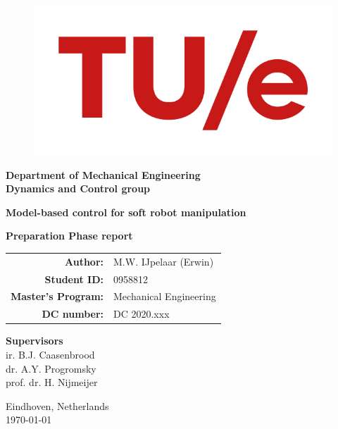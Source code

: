 
\begin{titlepage}

          \begin{figure}[H]
                \centering
              \includegraphics[width=0.6\linewidth]{TitlePage/tue.png}
          \end{figure}

\begin{center}
\vspace*{5mm}


\large
    \textbf{Department of Mechanical Engineering} \\
    \textbf{Dynamics and Control group}

\vspace*{10mm}

    \huge
    \textbf{Model-based control for soft robot manipulation\\}
    
\vspace{15mm}
    \Large \textbf{Preparation Phase report} \\
    
\vspace*{2.6cm}
    
    \large
    \begin{tabular}{rl}
    \textbf{Author:}           & M.W. IJpelaar (Erwin)  \\
    \textbf{Student ID:}       & 0958812  \\
    \textbf{Master's Program:} & Mechanical Engineering \\
    \textbf{DC number:}        & DC 2020.xxx \\
    \end{tabular}

\vspace*{15mm}


        
    \large
 \textbf{Supervisors}   \\
    ir. B.J. Caasenbrood   \\
    dr. A.Y. Progromsky  \\
    prof. dr. H. Nijmeijer   \\



    \vspace*{2cm}
     \vspace{0.6cm}


	\begin{flushright}
		Eindhoven, Netherlands\\
		\today \\	
	\end{flushright}
	
\end{center}	
\end{titlepage}